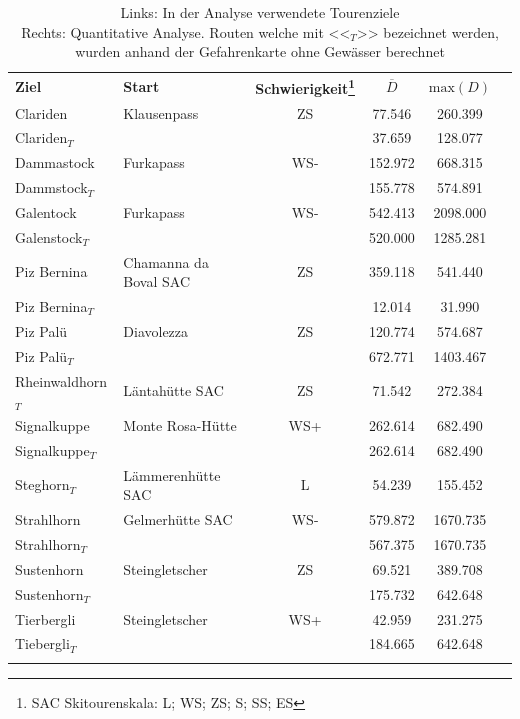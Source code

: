 \begin{table}[H]
  \centering

  \renewcommand{\arraystretch}{1.25}
  \begin{tabular}{ l l c | c c c |}

    \hhline{=====}
    \textbf{Ziel} & \textbf{Start} & \textbf{Schwierigkeit\footnote{SAC Skitourenskala: L; WS; ZS; S; SS; ES}} & $\overline{D}$ & $\text{max} (D)$\\
    \hhline{===|==}
    Clariden&Klausenpass&ZS&77.546&260.399\\
    Clariden$_T$&&&37.659&128.077\\
    Dammastock&Furkapass&WS-&152.972&668.315\\
    Dammstock$_T$&&&155.778&574.891\\
    Galentock&Furkapass&WS-&542.413&2098.000\\
    Galenstock$_T$&&&520.000&1285.281\\
    Piz Bernina&Chamanna da Boval SAC&ZS&359.118&541.440\\
    Piz Bernina$_T$&&&12.014&31.990\\
    Piz Palü&Diavolezza&ZS&120.774&574.687\\
    Piz Palü$_T$&&&672.771&1403.467\\
    Rheinwaldhorn$_T$&Läntahütte SAC&ZS&71.542&272.384\\
    Signalkuppe&Monte Rosa-Hütte&WS+&262.614&682.490\\
    Signalkuppe$_T$&&&262.614&682.490\\
    Steghorn$_T$&Lämmerenhütte SAC&L&54.239&155.452\\
    Strahlhorn&Gelmerhütte SAC&WS-&579.872&1670.735\\
    Strahlhorn$_T$&&&567.375&1670.735\\
    Sustenhorn&Steingletscher&ZS&69.521&389.708\\
    Sustenhorn$_T$&&&175.732&642.648\\
    Tierbergli&Steingletscher&WS+&42.959&231.275\\
    Tiebergli$_T$&&&184.665&642.648\\
    \hhline{===|==}
  \end{tabular}

  \renewcommand{\arraystretch}{1}
  \caption{Links: In der Analyse verwendete Tourenziele\\Rechts: Quantitative Analyse. Routen welche mit <<$_T$>> bezeichnet werden, wurden anhand der Gefahrenkarte ohne Gewässer berechnet}\label{tab:evalroutes}
\end{table}

